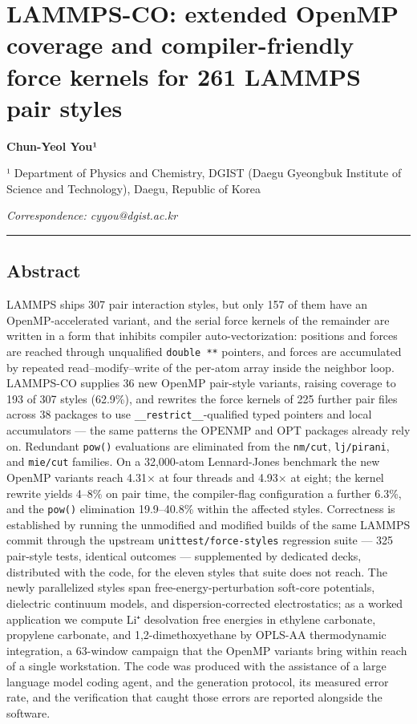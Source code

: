 \documentclass[
  11pt,
]{article}
\author{}
\date{}
\begin{document}
\section{LAMMPS-CO: extended OpenMP coverage and compiler-friendly force
kernels for 261 LAMMPS pair
styles}\label{lammps-co-extended-openmp-coverage-and-compiler-friendly-force-kernels-for-261-lammps-pair-styles}

\textbf{Chun-Yeol You¹}

¹ Department of Physics and Chemistry, DGIST (Daegu Gyeongbuk Institute
of Science and Technology), Daegu, Republic of Korea

\emph{Correspondence: cyyou@dgist.ac.kr}

\begin{center}\rule{0.5\linewidth}{0.5pt}\end{center}

\subsection{Abstract}\label{abstract}

LAMMPS ships 307 pair interaction styles, but only 157 of them have an
OpenMP-accelerated variant, and the serial force kernels of the
remainder are written in a form that inhibits compiler
auto-vectorization: positions and forces are reached through unqualified
\texttt{double\ **} pointers, and forces are accumulated by repeated
read--modify--write of the per-atom array inside the neighbor loop.
LAMMPS-CO supplies 36 new OpenMP pair-style variants, raising coverage
to 193 of 307 styles (62.9\%), and rewrites the force kernels of 225
further pair files across 38 packages to use
\texttt{\_\_restrict\_\_}-qualified typed pointers and local
accumulators --- the same patterns the OPENMP and OPT packages already
rely on. Redundant \texttt{pow()} evaluations are eliminated from the
\texttt{nm/cut}, \texttt{lj/pirani}, and \texttt{mie/cut} families. On a
32,000-atom Lennard-Jones benchmark the new OpenMP variants reach 4.31×
at four threads and 4.93× at eight; the kernel rewrite yields 4--8\% on
pair time, the compiler-flag configuration a further 6.3\%, and the
\texttt{pow()} elimination 19.9--40.8\% within the affected styles.
Correctness is established by running the unmodified and modified builds
of the same LAMMPS commit through the upstream
\texttt{unittest/force-styles} regression suite --- 325 pair-style
tests, identical outcomes --- supplemented by dedicated decks,
distributed with the code, for the eleven styles that suite does not
reach. The newly parallelized styles span free-energy-perturbation
soft-core potentials, dielectric continuum models, and
dispersion-corrected electrostatics; as a worked application we compute
Li⁺ desolvation free energies in ethylene carbonate, propylene
carbonate, and 1,2-dimethoxyethane by OPLS-AA thermodynamic integration,
a 63-window campaign that the OpenMP variants bring within reach of a
single workstation. The code was produced with the assistance of a large
language model coding agent, and the generation protocol, its measured
error rate, and the verification that caught those errors are reported
alongside the software.
\end{document}
